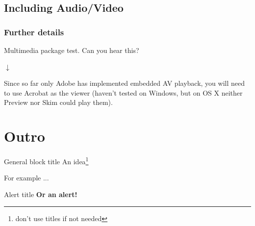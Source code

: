 \documentclass{beamer}
\begin{document}
\subsection[av]{Including Audio/Video}

\begin{frame}\frametitle{Further details}
{
\centering
Multimedia package test. Can you hear this?

$\downarrow$


\scriptsize
Since so far only Adobe has implemented embedded AV playback, you will need to use Acrobat as the viewer (haven't tested on Windows, but on OS X neither Preview nor Skim could play them).

}


\end{frame}


\section[Outro]{Outro}
\begin{frame}[plain]
    \tableofcontents[currentsection]
\end{frame}
\addtocounter{framenumber}{-1}  %

\begin{frame}

    \begin{block}{General block title}
    An idea\footnote{don't use titles if not needed}
    \end{block}

    \begin{example}[ex. 1]
    For example ...
    \end{example}

    \begin{alertblock}{Alert title}
    \centering
    \textbf{Or an alert!}
    \end{alertblock}

\end{frame}
\end{document}
